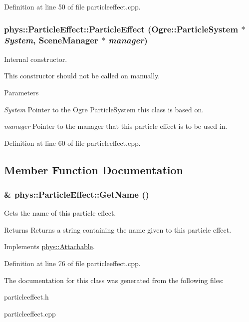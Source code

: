 Definition at line 50 of file particleeffect.cpp.

\hypertarget{classphys_1_1ParticleEffect_a112c7e4b2ec7c34c3aba3bd422ef8a1c}{
\subsubsection[{ParticleEffect}]{\setlength{\rightskip}{0pt plus 5cm}phys::ParticleEffect::ParticleEffect (Ogre::ParticleSystem $\ast$ {\em System}, \/  {\bf SceneManager} $\ast$ {\em manager})}}
\label{d2/d69/classphys_1_1ParticleEffect_a112c7e4b2ec7c34c3aba3bd422ef8a1c}


Internal constructor. 

This constructor should not be called on manually. 
\begin{DoxyParams}{Parameters}
\item[{\em System}]Pointer to the Ogre ParticleSystem this class is based on. \item[{\em manager}]Pointer to the manager that this particle effect is to be used in. \end{DoxyParams}


Definition at line 60 of file particleeffect.cpp.



\subsection{Member Function Documentation}
\hypertarget{classphys_1_1ParticleEffect_a4e953f59bd989c7e5e59d26adf9fd60a}{
\subsubsection[{GetName}]{ \& phys::ParticleEffect::GetName ()}}
\label{d2/d69/classphys_1_1ParticleEffect_a4e953f59bd989c7e5e59d26adf9fd60a}


Gets the name of this particle effect. 

\begin{DoxyReturn}{Returns}
Returns a string containing the name given to this particle effect. 
\end{DoxyReturn}


Implements \hyperlink{classphys_1_1Attachable_a56d2f5a6f17c14ff0c1d9906d17b0f52}{phys::Attachable}.



Definition at line 76 of file particleeffect.cpp.



The documentation for this class was generated from the following files:\begin{DoxyCompactItemize}
\item 
particleeffect.h\item 
particleeffect.cpp\end{DoxyCompactItemize}
